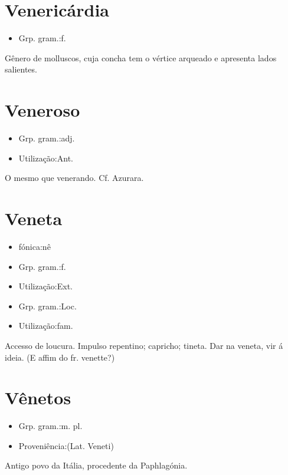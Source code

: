 \documentclass{article}
\begin{document}
\section{Venericárdia}
\begin{itemize}
\item {Grp. gram.:f.}
\end{itemize}
Gênero de molluscos, cuja concha tem o vértice arqueado e apresenta lados salientes.
\section{Veneroso}
\begin{itemize}
\item {Grp. gram.:adj.}
\end{itemize}
\begin{itemize}
\item {Utilização:Ant.}
\end{itemize}
O mesmo que \textunderscore venerando\textunderscore . Cf. Azurara.
\section{Veneta}
\begin{itemize}
\item {fónica:nê}
\end{itemize}
\begin{itemize}
\item {Grp. gram.:f.}
\end{itemize}
\begin{itemize}
\item {Utilização:Ext.}
\end{itemize}
\begin{itemize}
\item {Grp. gram.:Loc.}
\end{itemize}
\begin{itemize}
\item {Utilização:fam.}
\end{itemize}
Accesso de loucura.
Impulso repentino; capricho; tineta.
\textunderscore Dar na veneta\textunderscore , vir á ideia.
(E affim do fr. \textunderscore venette\textunderscore ?)
\section{Vênetos}
\begin{itemize}
\item {Grp. gram.:m. pl.}
\end{itemize}
\begin{itemize}
\item {Proveniência:(Lat. \textunderscore Veneti\textunderscore )}
\end{itemize}
Antigo povo da Itália, procedente da Paphlagónia.
\end{document}
